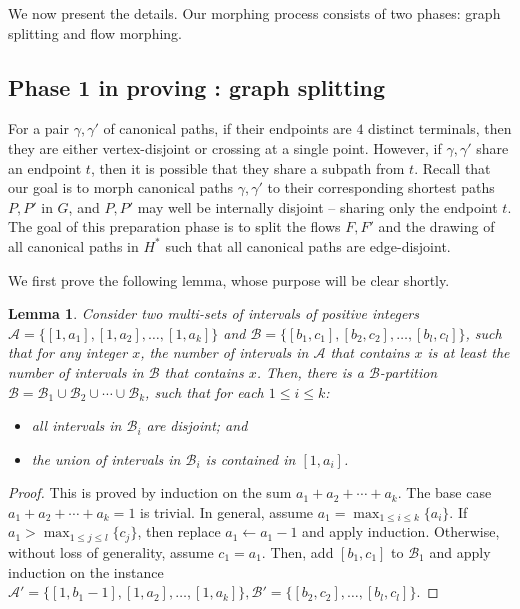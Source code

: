 \documentclass[11pt]{article}
\newtheorem{lemma}[theorem]{Lemma}
\newcommand{\aset}{{\mathcal{A}}}
\newcommand{\bset}{{\mathcal{B}}}
\begin{document}
We now present the details. Our morphing process consists of two phases: graph splitting and flow morphing.

\subsection{Phase 1 in proving : graph splitting}

For a pair $\gamma,\gamma'$ of canonical paths, if their endpoints are $4$ distinct terminals, then they are either vertex-disjoint or crossing at a single point. However, if $\gamma,\gamma'$ share an endpoint $t$, then it is possible that they share a subpath from $t$. Recall that our goal is to morph canonical paths $\gamma,\gamma'$ to their corresponding shortest paths $P,P'$ in $G$, and $P,P'$ may well be internally disjoint -- sharing only the endpoint $t$.
The goal of this preparation phase is to split the flows $F,F'$ and the drawing of all canonical paths in $H^*$ such that all canonical paths are edge-disjoint. 

We first prove the following lemma, whose purpose will be clear shortly.

\begin{lemma}\label{interval-packing}
    Consider two multi-sets of intervals of positive integers $\aset = \{[1, a_1], [1, a_2], \ldots, [1, a_k]\}$ and $\bset = \{[b_1, c_1], [b_2, c_2], \ldots, [b_l, c_l]\}$, such that for any integer $x$, the number of intervals in $\aset$ that contains $x$ is at least the number of intervals in $\bset$ that contains $x$. Then, there is a $\bset$-partition $\bset = \bset_1\cup \bset_2\cup \cdots \cup \bset_k$, such that for each $1\leq i\leq k$:
    \begin{itemize}
        \item all intervals in $\bset_i$ are disjoint; and
        \item the union of intervals in $\bset_i$ is contained in $[1, a_i]$.
    \end{itemize}
\end{lemma}
\begin{proof}
    This is proved by induction on the sum $a_1+a_2+\cdots+a_k$. The base case $a_1+a_2+\cdots+a_k = 1$ is trivial. In general, assume $a_1 = \max_{1\leq i\leq k}\{a_i\}$. If $a_1 > \max_{1\leq j\leq l}\{c_j\}$, then replace $a_1\leftarrow a_1-1$ and apply induction. Otherwise, without loss of generality, assume $c_1 = a_1$. Then, add $[b_1, c_1]$ to $\bset_1$ and apply induction on the instance $\aset' = \{[1, b_1-1], [1, a_2], \ldots, [1, a_k]\}, \bset' = \{[b_2, c_2], \ldots, [b_l, c_l]\}$.
\end{proof}
\end{document}
